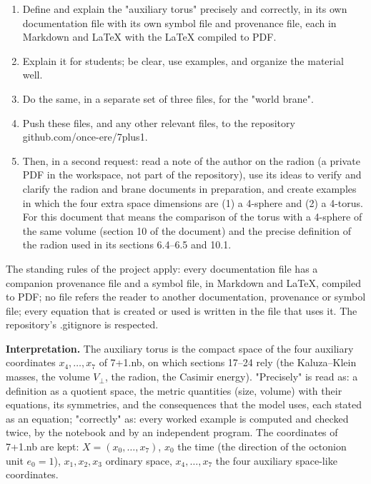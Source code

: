 \documentclass[10pt,a4paper]{article}
\begin{document}
\begin{enumerate}
\item Define and explain the "auxiliary torus" precisely and correctly, in its own documentation file with its own symbol file and provenance file, each in Markdown and LaTeX with the LaTeX compiled to PDF.
\item Explain it for students; be clear, use examples, and organize the material well.
\item Do the same, in a separate set of three files, for the "world brane".
\item Push these files, and any other relevant files, to the repository github.com/once-ere/7plus1.
\item Then, in a second request: read a note of the author on the radion (a private PDF in the workspace, not part of the repository), use its ideas to verify and clarify the radion and brane documents in preparation, and create examples in which the four extra space dimensions are (1) a 4-sphere and (2) a 4-torus. For this document that means the comparison of the torus with a 4-sphere of the same volume (section 10 of the document) and the precise definition of the radion used in its sections 6.4–6.5 and 10.1.
\end{enumerate}
The standing rules of the project apply: every documentation file has a companion provenance file and a symbol file, in Markdown and LaTeX, compiled to PDF; no file refers the reader to another documentation, provenance or symbol file; every equation that is created or used is written in the file that uses it. The repository’s .gitignore is respected.

\textbf{Interpretation.} The auxiliary torus is the compact space of the four auxiliary coordinates $x_4,\dots,x_7$ of 7+1.nb, on which sections 17–24 rely (the Kaluza–Klein masses, the volume $V_\perp$, the radion, the Casimir energy). "Precisely" is read as: a definition as a quotient space, the metric quantities (size, volume) with their equations, its symmetries, and the consequences that the model uses, each stated as an equation; "correctly" as: every worked example is computed and checked twice, by the notebook and by an independent program. The coordinates of 7+1.nb are kept: $X=(x_0,\dots,x_7)$, $x_0$ the time (the direction of the octonion unit $e_0=1$), $x_1,x_2,x_3$ ordinary space, $x_4,\dots,x_7$ the four auxiliary space-like coordinates.
\end{document}
